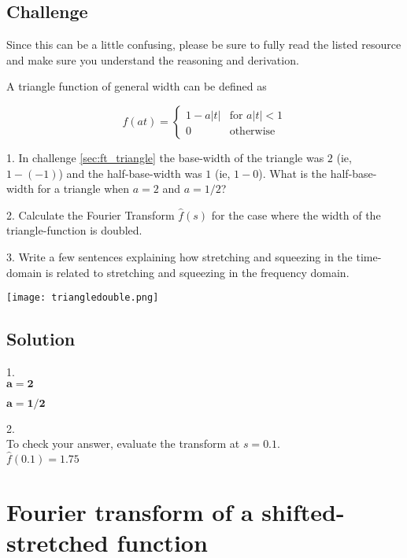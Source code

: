 \subsection*{Challenge}
Since this can be a little confusing, please be sure to fully read the listed resource and make sure you understand the reasoning and derivation.

A triangle function of general width can be defined as

\begin{equation}
    f(at)=
    \begin{cases}
        1 - a|t| & \text{for } a|t| < 1\\
        0 & \text{otherwise}
    \end{cases}
\end{equation}

1. In challenge \ref{sec:ft_triangle} the base-width of the triangle was $2$ (ie, $1-(-1)$) and the half-base-width was $1$ (ie, $1-0$). What is the half-base-width for a triangle when $a=2$ and $a=1/2$?

2. Calculate the Fourier Transform $\hat{f}(s)$ for the case where the width of the triangle-function is doubled.

3. Write a few sentences explaining how stretching and squeezing in the time-domain is related to stretching and squeezing in the frequency domain.

\texttt{[image: triangledouble.png]}

\subsection*{Solution}
1.\\
$\bm{a=2}$\\

$\bm{a=1/2}$\\

2.\\
To check your answer, evaluate the transform at $s=0.1$.\\
$\hat{f}(0.1)=1.75$




\newpage
\section{Fourier transform of a shifted-stretched function}
\label{sec:shiftstretch}

